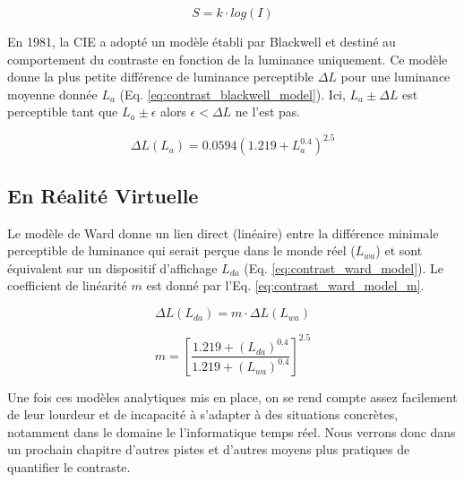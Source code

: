 	\begin{equation}
	S = k \cdot log(I)
	\label{eq:contrast_weber_fechner_law}
	\end{equation}
	
	\par En 1981, la CIE a adopté un modèle établi par Blackwell et destiné au comportement du contraste en fonction de la luminance uniquement. Ce modèle donne la plus petite différence de luminance perceptible $\Delta L$ pour une luminance moyenne donnée $L_{a}$ (Eq. \ref{eq:contrast_blackwell_model}). Ici, $L_{a} \pm \Delta L$ est perceptible tant que $L_{a} \pm \epsilon$ alors $\epsilon < \Delta L$ ne l'est pas.
	
	\begin{equation}
	\Delta L(L_{a}) = 0.0594 (1.219 + L_{a}^{0.4})^{2.5}
	\label{eq:contrast_blackwell_model}
	\end{equation}
	
	\subsection{En Réalité Virtuelle}
	\par Le modèle de Ward donne un lien direct (linéaire) entre la différence minimale perceptible de luminance qui serait perçue dans le monde réel ($L_{wa}$) et sont équivalent sur un dispositif d'affichage $L_{da}$ (Eq. \ref{eq:contrast_ward_model}). Le coefficient de linéarité $m$ est donné par l'Eq. \ref{eq:contrast_ward_model_m}.
	
	\begin{equation}
	\Delta L(L_{da}) = m \cdot \Delta L(L_{wa})
	\label{eq:contrast_ward_model}
	\end{equation}
	
	\begin{equation}
	m = {\left[ \frac{1.219 + (L_{da})^{0.4}}{1.219 + (L_{wa})^{0.4}} \right]}^{2.5}
	\label{eq:contrast_ward_model_m}
	\end{equation}
	
	\par Une fois ces modèles analytiques mis en place, on se rend compte assez facilement de leur lourdeur et de incapacité à s'adapter à des situations concrètes, notamment dans le domaine le l'informatique temps réel. Nous verrons donc dans un prochain chapitre d'autres pistes et d'autres moyens plus pratiques de quantifier le contraste.
	
